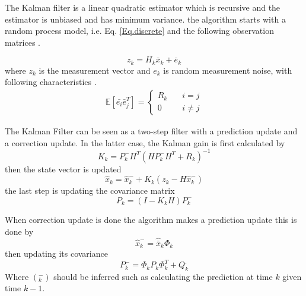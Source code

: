 The Kalman filter is a linear quadratic estimator which is recursive and the estimator is unbiased and has minimum variance. the algorithm starts with a random process model, i.e. Eq. \eqref{Eq.discrete} and the following observation matrices \cite{Discrete_kalman}.

\begin{equation}
z_k = H_k\bar{x}_k + \bar{e}_k
\end{equation}
where $z_k$ is the measurement vector and $e_k$ is random measurement noise, with following characteristics \cite{signal_process}.
\begin{align}
\mathbb{E}[\bar{e_i}\bar{e}_j^T] =
\begin{cases}
  R_k &\quad i=j\\    
  0 &\quad i\neq j   
\end{cases}
\end{align}

The Kalman Filter can be seen as a two-step filter with a prediction update and a correction update. In the latter case, the Kalman gain is first calculated by
\begin{equation}
K_k = P_k^-H^T(HP_k^-H^T+R_k)^{-1}
\end{equation}
then the state vector is updated
\begin{equation}
\hat{x}_k = \hat{x}_k^- + K_k(z_k-H\hat{x}_k^-)
\end{equation}
the last step is updating the covariance matrix
\begin{equation}
P_k = (I-K_kH)P_k^-
\end{equation}

When correction update is done the algorithm makes a prediction update this is done by 
\begin{equation}
\hat{x}_k^- = \hat{\bar{x}}_k\Phi_k
\end{equation}
then updating its covariance
\begin{equation}
P_k^- = \Phi_k P_k \Phi_k^T + Q_k^.
\end{equation}
Where $(_k^-)$ should be inferred such as calculating the prediction at time $k$ given time $k-1$.\\

